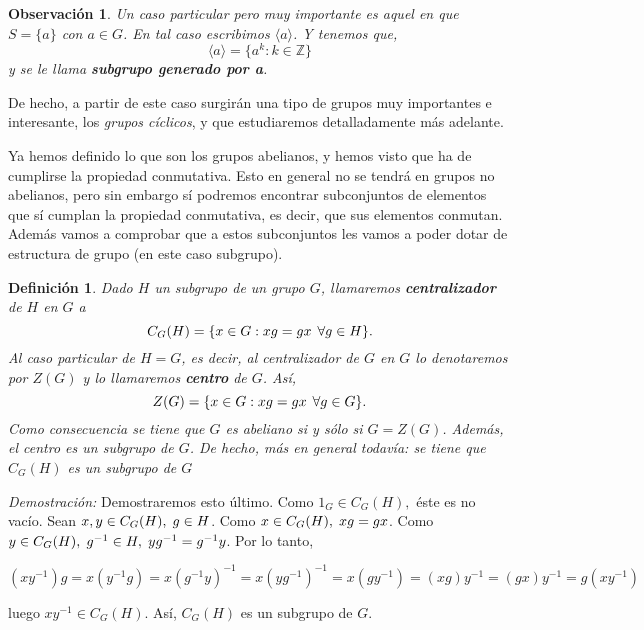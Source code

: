 \documentclass[12pt]{article}
\newtheorem{definition}[theorem]{Definición}
\newtheorem{observation}{Observación}[theorem]
\begin{document}
\begin{observation} Un caso particular pero muy importante es aquel en que $S = \lbrace a \rbrace$ con $a \in G$. En tal caso escribimos $\langle a \rangle$. Y tenemos que, $$\langle a \rangle = \lbrace a^{k} : k \in \mathbb{Z}\rbrace$$ y se le llama \textbf{subgrupo generado por a}.\end{observation}

De hecho, a partir de este caso surgirán una tipo de grupos muy importantes e interesante, los \textit{grupos cíclicos}, y que estudiaremos detalladamente más adelante.

Ya hemos definido lo que son los grupos abelianos, y hemos visto que ha de cumplirse la propiedad conmutativa. Esto en general no se tendrá en grupos no abelianos, pero sin embargo sí podremos encontrar subconjuntos de elementos que sí cumplan la propiedad conmutativa, es decir, que sus elementos conmutan. Además vamos a comprobar que a estos subconjuntos les vamos a poder dotar de estructura de grupo (en este caso subgrupo).

\begin{definition}\label{eq:centro} Dado $H$ un subgrupo de un grupo $G$, llamaremos \textbf{centralizador} de $H$ en $G$ a $$C_{G}(H) = \lbrace x \in G : xg = gx \hspace{0.15cm} \forall g \in H\rbrace.$$
Al caso particular de $H = G$, es decir, al centralizador de $G$ en $G$ lo denotaremos por $Z(G)$ y lo llamaremos \textbf{centro} de $G$. Así, $$Z(G) = \lbrace x \in G : xg = gx \hspace{0.15cm} \forall g \in G\rbrace.$$
Como consecuencia se tiene que $G$ es abeliano si y sólo si $G = Z(G)$. Además, el centro es un subgrupo de $G$. De hecho, más en general todavía: se tiene que $C_{G}(H)$ es un subgrupo de $G$
\end{definition}
\emph{Demostración: } Demostraremos esto último. Como $1_{G} \in C_{G}(H),$ éste es no vacío. Sean $x,y \in C_{G}(H),\hspace{0.1cm} g \in H$. Como $x\in C_{G}(H),\hspace{0.1cm} xg = gx$. Como $y \in C_{G}(H), \hspace{0.1cm} g^{-1} \in H,\hspace{0.1cm} yg^{-1} = g^{-1}y$. Por lo tanto, \begin{center}$(xy^{-1})g = x(y^{-1}g) = x(g^{-1}y)^{-1} = x(yg^{-1})^{-1} = x(gy^{-1}) = (xg)y^{-1} = (gx)y^{-1} = g(xy^{-1})$\end{center} luego $xy^{-1} \in C_{G}(H)$. Así, $C_{G}(H)$ es un subgrupo de $G$.
\end{document}
